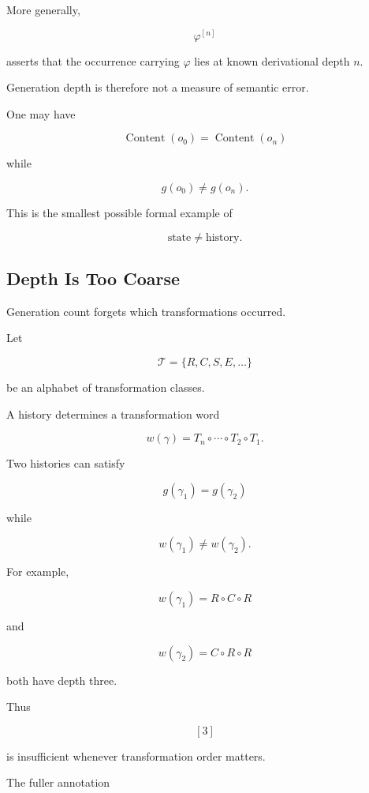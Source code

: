 \documentclass[
  11pt,
  a4paper,
  DIV=12,
  BCOR=0mm,
  parskip=half-
]{scrartcl}
\newcommand{\Content}{\operatorname{Content}}
\theoremstyle{definition}
\theoremstyle{plain}
\theoremstyle{remark}
\begin{document}
More generally,

\[
  \varphi^{[n]}
\]

asserts that the occurrence carrying \(\varphi\) lies at known derivational
depth \(n\).

Generation depth is therefore not a measure of semantic error.

One may have

\[
  \Content(o_0)
  =
  \Content(o_n)
\]

while

\[
  g(o_0)\neq g(o_n).
\]

This is the smallest possible formal example of

\[
  \text{state}\neq\text{history}.
\]


\subsection{Depth Is Too Coarse}
\label{app:transformation-words}

Generation count forgets which transformations occurred.

Let

\[
  \mathcal T
  =
  \{
    R,C,S,E,\ldots
  \}
\]

be an alphabet of transformation classes.

A history determines a transformation word

\[
  w(\gamma)
  =
  T_n\circ\cdots\circ T_2\circ T_1.
\]

Two histories can satisfy

\[
  g(\gamma_1)
  =
  g(\gamma_2)
\]

while

\[
  w(\gamma_1)
  \neq
  w(\gamma_2).
\]

For example,

\[
  w(\gamma_1)
  =
  R\circ C\circ R
\]

and

\[
  w(\gamma_2)
  =
  C\circ R\circ R
\]

both have depth three.

Thus

\[
  [3]
\]

is insufficient whenever transformation order matters.

The fuller annotation
\end{document}
